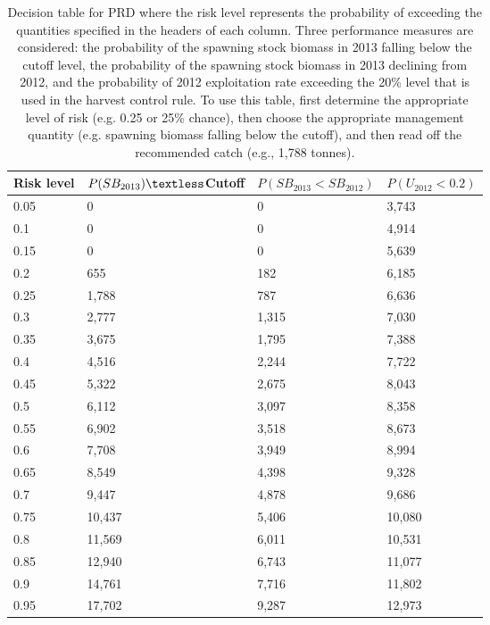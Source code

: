 %
\begin{table}[!tbp]
 \caption{Decision table for PRD where the risk 
			level represents the probability of exceeding the quantities specified
			in the headers of each column.  Three performance measures are considered:
			the probability of the spawning stock biomass in 2013 falling below the cutoff
			level,  the probability of the spawning stock biomass in 2013 declining from 2012, 
			and the probability of 2012 exploitation rate exceeding the 20\% level that is
			used in the harvest control rule. To use this table, first determine the 
			appropriate level of risk (e.g. 0.25 or 25\% chance),  then choose the appropriate
			management quantity (e.g. spawning biomass falling below the cutoff), and then read
			off the recommended catch (e.g.,  1,788 tonnes).\label{Table:RiskPRD}} 
 \begin{center}
 \begin{tabular}{llll}\hline\hline
\multicolumn{1}{c}{Risk level}&\multicolumn{1}{c}{$P(SB_{2013})\textless$Cutoff}&\multicolumn{1}{c}{$P(SB_{2013}<SB_{2012})$}&\multicolumn{1}{c}{$P(U_{2012}<0.2)$}\tabularnewline
\hline
0.05&     0&    0& 3,743\tabularnewline
0.1&     0&    0& 4,914\tabularnewline
0.15&     0&    0& 5,639\tabularnewline
0.2&   655&  182& 6,185\tabularnewline
0.25& 1,788&  787& 6,636\tabularnewline
0.3& 2,777&1,315& 7,030\tabularnewline
0.35& 3,675&1,795& 7,388\tabularnewline
0.4& 4,516&2,244& 7,722\tabularnewline
0.45& 5,322&2,675& 8,043\tabularnewline
0.5& 6,112&3,097& 8,358\tabularnewline
0.55& 6,902&3,518& 8,673\tabularnewline
0.6& 7,708&3,949& 8,994\tabularnewline
0.65& 8,549&4,398& 9,328\tabularnewline
0.7& 9,447&4,878& 9,686\tabularnewline
0.75&10,437&5,406&10,080\tabularnewline
0.8&11,569&6,011&10,531\tabularnewline
0.85&12,940&6,743&11,077\tabularnewline
0.9&14,761&7,716&11,802\tabularnewline
0.95&17,702&9,287&12,973\tabularnewline
\hline
\end{tabular}

\end{center}

\end{table}


